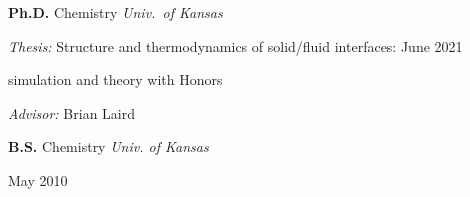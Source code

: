 {\bf Ph.D.} Chemistry \hfill \textit{Univ.\ of Kansas}

\textit{Thesis:} Structure and thermodynamics of solid/fluid interfaces: \hfill June 2021

\qquad\quad simulation and theory \hfill with Honors

\textit{Advisor:} Brian Laird

\vspace{\y}
{\bf B.S.} Chemistry \hfill \textit{Univ. of Kansas}

\hfill May 2010
